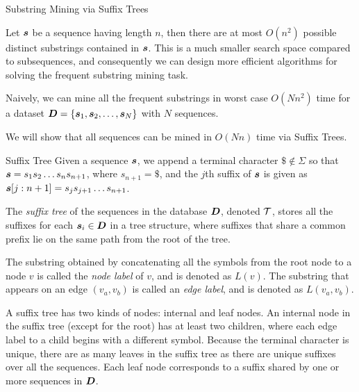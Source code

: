 \ifdefined\wox \begin{frame} \titlepage \end{frame} \fi


\begin{frame}{Substring Mining via Suff\/{i}x Trees}

  Let ${\boldsymbol s}$ be a sequence having length $n$, then
there are at most $O(n^2)$ possible distinct
substrings contained in ${\boldsymbol s}$. This is a much smaller search space compared to subsequences, and
consequently we can design more eff\/{i}cient algorithms for solving
the frequent substring mining task. 

\bigskip
Naively, we can mine all the
frequent substrings in worst case $O(Nn^2)$ time for a dataset
${\boldsymbol D}=\{{\boldsymbol s}_1, {\boldsymbol s}_2, \ldots, {\boldsymbol s}_N\}$ with $N$ sequences.

\bigskip
We will show that all sequences can be mined in $O(Nn)$ time via Suffix
Trees.
\end{frame}



\begin{frame}{Suff\/{i}x Tree}
Given a sequence ${\boldsymbol s}$, we append a terminal character 
$\$ \not\in \Sigma$ so that
${\boldsymbol s} = s_{1}s_{2} \dots s_{n}s_{n+1}$, where $s_{n+1}=\$$, and
the $j$th suff\/{i}x of ${\boldsymbol s}$ is given as
${\boldsymbol s}[j:n+1] = s_{j}s_{j+1} \dots s_{n+1}$.

\medskip
The {\em suff\/{i}x tree} of the sequences in the database ${\boldsymbol D}$,
denoted ${\mathcal T}$,
 stores all the
suff\/{i}xes for each ${\boldsymbol s}_i \in {\boldsymbol D}$ in a tree structure, where suff\/{i}xes
that share a common pref\/{i}x lie on the same path from the root of the
tree.

\medskip
The substring obtained by
concatenating all the symbols from the root node to a node $v$ is
called the {\em node label} of $v$, and is denoted as $L(v)$.
The substring
that appears on an edge $(v_a,v_b)$ is called an {\em edge label},
and is denoted as $L(v_a,v_b)$.

\medskip
A suff\/{i}x
tree has two kinds of nodes: internal and leaf nodes.  An internal
node in the suff\/{i}x tree (except for the root) has at least two children,
where each edge label to a child begins with a different symbol.  Because
the terminal character is unique, there are as many leaves in the
suff\/{i}x tree as there are unique suff\/{i}xes over all the sequences.
Each leaf node corresponds to a suff\/{i}x shared by one or
more sequences in ${\boldsymbol D}$.
\end{frame}


